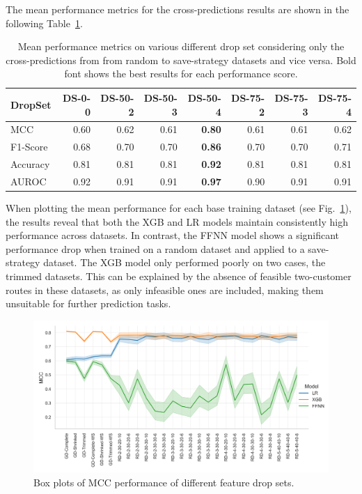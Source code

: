 The mean performance metrics for the cross-predictions results are shown in the following Table~\ref{tab:featurePerformance_OnlyCrossCorrelation}.
\begin{table}[ht]
	\centering
	\small
	\begin{tabular}{lrrrrrrr}
		\toprule
		DropSet  & DS-0-0 & DS-50-2 & DS-50-3 & DS-50-4       & DS-75-2 & DS-75-3 & DS-75-4 \\
		\midrule
		MCC      & 0.60   & 0.62    & 0.61    & \textbf{0.80} & 0.61    & 0.61    & 0.62    \\
		F1-Score & 0.68   & 0.70    & 0.70    & \textbf{0.86} & 0.70    & 0.70    & 0.71    \\
		Accuracy & 0.81   & 0.81    & 0.81    & \textbf{0.92} & 0.81    & 0.81    & 0.81    \\
		AUROC    & 0.92   & 0.91    & 0.91    & \textbf{0.97} & 0.90    & 0.91    & 0.91    \\
		\bottomrule
	\end{tabular}
	\caption[Mean performance metrics on various different drop set considering only the cross-predictions from random to save-strategy datasets and vice versa.]
	{Mean performance metrics on various different drop set considering only the cross-predictions from from random to save-strategy datasets and vice versa.
		Bold font shows the best results for each performance score.}
	\label{tab:featurePerformance_OnlyCrossCorrelation}
\end{table}
When plotting the mean performance for each base training dataset (see Fig.~\ref{fig:mcc_filter_results_lineplot}),
the results reveal that both the XGB and LR models maintain consistently high performance across datasets. In contrast,
the FFNN model shows a significant performance drop when trained on a random dataset and applied to a save-strategy dataset.
The XGB model only performed poorly on two cases, the trimmed datasets. This can be explained by the absence of feasible
two-customer routes in these datasets, as only infeasible ones are included, making them unsuitable for further prediction tasks.
\begin{figure}[ht]
	\centering
	\includegraphics[width = .95\textwidth]{pictures/feature_filter/cross_performance_lineplot.png}
	\caption{Box plots of MCC performance of different feature drop sets.}
	\label{fig:mcc_filter_results_lineplot}
\end{figure}%
